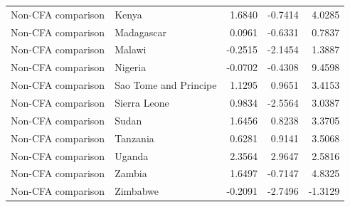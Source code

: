 \begin{table}
\begin{tabular}[t]{llrrr}
Non-CFA comparison & Kenya & 1.6840 & -0.7414 & 4.0285\\
\addlinespace
Non-CFA comparison & Madagascar & 0.0961 & -0.6331 & 0.7837\\
Non-CFA comparison & Malawi & -0.2515 & -2.1454 & 1.3887\\
Non-CFA comparison & Nigeria & -0.0702 & -0.4308 & 9.4598\\
Non-CFA comparison & Sao Tome and Principe & 1.1295 & 0.9651 & 3.4153\\
Non-CFA comparison & Sierra Leone & 0.9834 & -2.5564 & 3.0387\\
\addlinespace
Non-CFA comparison & Sudan & 1.6456 & 0.8238 & 3.3705\\
Non-CFA comparison & Tanzania & 0.6281 & 0.9141 & 3.5068\\
Non-CFA comparison & Uganda & 2.3564 & 2.9647 & 2.5816\\
Non-CFA comparison & Zambia & 1.6497 & -0.7147 & 4.8325\\
Non-CFA comparison & Zimbabwe & -0.2091 & -2.7496 & -1.3129\\
\bottomrule
\end{tabular}
\end{table}